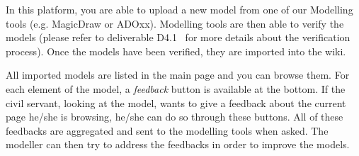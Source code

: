 \documentclass{learnpad}
\begin{document}
In this platform, you are able to upload a new model from one of our Modelling
tools (e.g. MagicDraw or ADOxx).  Modelling tools are then able to verify the 
models (please refer to deliverable D4.1~\cite{learnpad:D4.1} for more details 
about the verification process). Once the models have been verified, they are 
imported into the wiki.

All imported models are listed in the main page and you can browse them.  For
each element of the model, a \textit{feedback} button is available at the 
bottom. If the civil servant, looking at the model, wants to give a feedback 
about the current page he/she is browsing, he/she can do so through these buttons.  All of 
these feedbacks are aggregated and sent to the modelling tools when asked.  The 
modeller can then try to address the feedbacks in order to improve the models.







 

\end{document}
